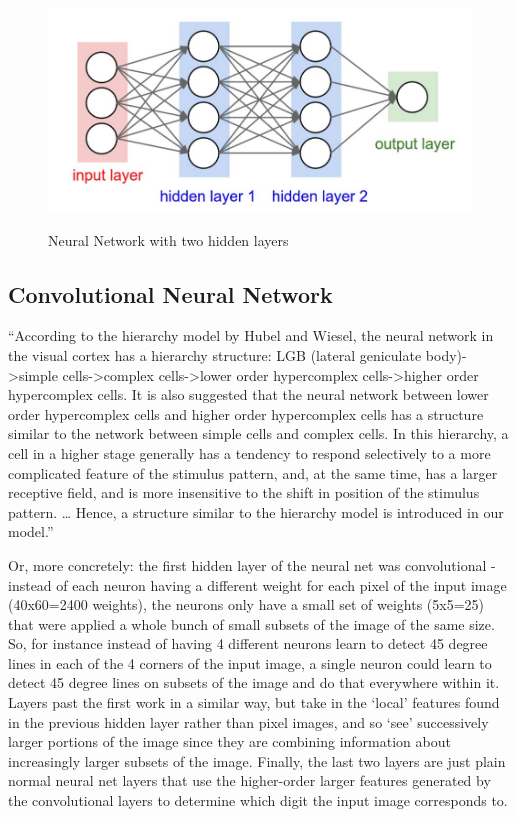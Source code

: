\begin{figure}[H]
\begin{center}
\includegraphics[height=.28\textheight]{Chapter2/Figs/TwoLayeredNN.png}
\label{fig:Two Layered Neural_Network}
\caption{Neural Network with two hidden layers \cite{karparthy}}
\end{center}
\end{figure}


\subsection{Convolutional Neural Network}

“According to the hierarchy model by Hubel and Wiesel, the neural network in the visual cortex has a hierarchy structure: LGB (lateral geniculate body)->simple cells->complex cells->lower order hypercomplex cells->higher order hypercomplex cells. It is also suggested that the neural network between lower order hypercomplex cells and higher order hypercomplex cells has a structure similar to the network between simple cells and complex cells. In this hierarchy, a cell in a higher stage generally has a tendency to respond selectively to a more complicated feature of the stimulus pattern, and, at the same time, has a larger receptive field, and is more insensitive to the shift in position of the stimulus pattern. … Hence, a structure similar to the hierarchy model is introduced in our model.”

Or, more concretely: the first hidden layer of the neural net was convolutional - instead of each neuron having a different weight for each pixel of the input image (40x60=2400 weights), the neurons only have a small set of weights (5x5=25) that were applied a whole bunch of small subsets of the image of the same size. So, for instance instead of having 4 different neurons learn to detect 45 degree lines in each of the 4 corners of the input image, a single neuron could learn to detect 45 degree lines on subsets of the image and do that everywhere within it. Layers past the first work in a similar way, but take in the ‘local’ features found in the previous hidden layer rather than pixel images, and so ‘see’ successively larger portions of the image since they are combining information about increasingly larger subsets of the image. Finally, the last two layers are just plain normal neural net layers that use the higher-order larger features generated by the convolutional layers to determine which digit the input image corresponds to.


